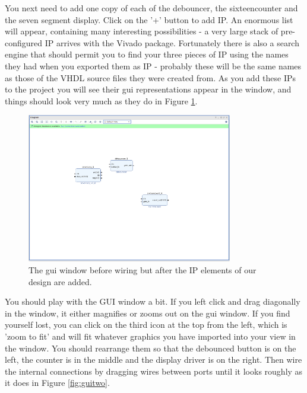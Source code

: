\documentclass[../physical_computing.tex]{subfiles}
\begin{document}
You next need to add one copy of each of the debouncer, the sixteencounter and the seven segment display. Click on the '+' button to add IP. An enormous list will appear, containing many interesting possibilities - a very large stack of pre-configured IP arrives with the Vivado package. Fortunately there is also a search engine that should permit you to find your three pieces of IP using the names they had when you exported them as IP - probably these will be the same names as those of the VHDL source files they were created from. As you add these IPs to the project you 
will see their gui representations appear in the window, and things should look very much as they do in Figure \ref{fig:guione}.

\begin{figure}[htbp]
    \centering
    \includegraphics[width=0.8\textwidth]{figures/guione.png}
    \caption{The gui window before wiring but after the IP elements of our design are added.}
    \label{fig:guione}
\end{figure}

You should play with the GUI window a bit. If you left click and drag diagonally in the window, it either magnifies or zooms out on the gui window. If you find yourself lost, you can click on the third icon at the top from the left, which is 'zoom to fit' and will fit whatever graphics you have imported into your view in the window. You should rearrange them so that the debounced button is on the left, the counter is in the middle and the display driver is on the right. Then wire the internal connections by dragging wires between ports until it looks roughly as it does in Figure \ref{fig:guitwo}.
\end{document}
